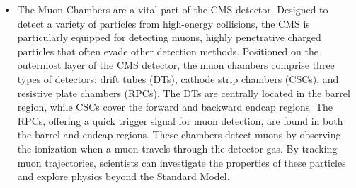 \begin{itemize}


\item The Muon Chambers are a vital part of the CMS detector. Designed to detect a variety of particles from high-energy collisions, the CMS is particularly equipped for detecting muons, highly penetrative charged particles that often evade other detection methods. Positioned on the outermost layer of the CMS detector, the muon chambers comprise three types of detectors: drift tubes (DTs), cathode strip chambers (CSCs), and resistive plate chambers (RPCs). The DTs are centrally located in the barrel region, while CSCs cover the forward and backward endcap regions. The RPCs, offering a quick trigger signal for muon detection, are found in both the barrel and endcap regions. These chambers detect muons by observing the ionization when a muon travels through the detector gas. By tracking muon trajectories, scientists can investigate the properties of these particles and explore physics beyond the Standard Model.




\end{itemize}
